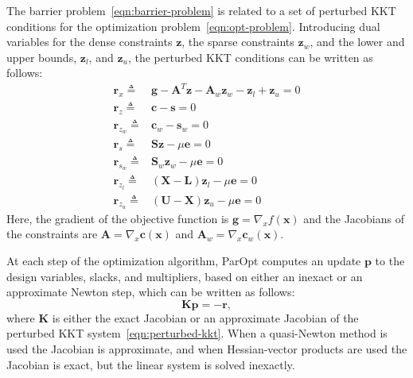 \documentclass[12pt]{article}
\newcommand{\mb}{\mathbf}
\begin{document}
The barrier problem~\eqref{eqn:barrier-problem} is related to a set of perturbed KKT conditions for the optimization problem~\eqref{eqn:opt-problem}.
Introducing dual variables for the dense constraints $\mb{z}$, the sparse constraints $\mb{z}_{w}$, and the lower and upper bounds, $\mb{z}_{l}$, and $\mb{z}_{u}$, the perturbed KKT conditions can be written as follows:
%
\begin{equation}
  \label{eqn:perturbed-kkt}
  \begin{aligned}
    \mb{r}_{x} \triangleq    & \mb{g} - \mb{A}^{T}\mb{z} - \mb{A}_{w} \mb{z}_{w} - \mb{z}_{l} + \mb{z}_{u} = 0 \\
    \mb{r}_{z} \triangleq    & \mb{c} - \mb{s} = 0 \\
    \mb{r}_{z_{w}} \triangleq & \mb{c}_{w} - \mb{s}_{w} = 0 \\
    \mb{r}_{s} \triangleq    & \mb{S} \mb{z} - \mu \mb{e} = 0 \\
    \mb{r}_{s_{w}} \triangleq & \mb{S}_{w} \mb{z}_{w} - \mu \mb{e} = 0\\
    \mb{r}_{z_{l}} \triangleq & (\mb{X} - \mb{L})\mb{z}_{l} - \mu \mb{e} = 0\\
    \mb{r}_{z_{u}} \triangleq & (\mb{U} - \mb{X})\mb{z}_{u} - \mu \mb{e} = 0
  \end{aligned}
\end{equation}
Here, the gradient of the objective function is $\mb{g} = \nabla_{x} f(\mb{x})$ and the Jacobians of the constraints are $\mb{A} = \nabla_{x} \mb{c}(\mb{x})$ and $\mb{A}_{w} = \nabla_{x} \mb{c}_{w}(\mb{x})$.

At each step of the optimization algorithm, ParOpt computes an update $\mb{p}$ to the design variables, slacks, and multipliers, based on either an inexact or an approximate Newton step, which can be written as follows:
%
\begin{equation*}
  \mb{K} \mb{p} = - \mb{r},
\end{equation*}
where $\mb{K}$ is either the exact Jacobian or an approximate Jacobian of the perturbed KKT system~\eqref{eqn:perturbed-kkt}.
When a quasi-Newton method is used the Jacobian is approximate, and when Hessian-vector products are used the Jacobian is exact, but the linear system is solved inexactly.
\end{document}
